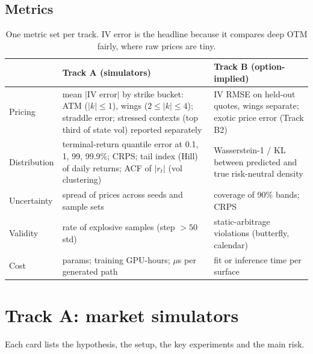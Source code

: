 \documentclass[10pt]{article}
\begin{document}
\subsection{Metrics}
\begin{table}[h]
\centering\small
\begin{tabularx}{\linewidth}{@{}l L L@{}}
\toprule
& \textbf{Track A (simulators)} & \textbf{Track B (option-implied)} \\
\midrule
Pricing & mean $|$IV error$|$ by strike bucket: ATM ($|k|\le1$), wings ($2\le|k|\le4$); straddle error; stressed contexts (top third of state vol) reported separately
& IV RMSE on held-out quotes, wings separate; exotic price error (Track B2)\\
Distribution & terminal-return quantile error at 0.1, 1, 99, 99.9\%; CRPS; tail index (Hill) of daily returns; ACF of $|r_t|$ (vol clustering)
& Wasserstein-1 / KL between predicted and true risk-neutral density \\
Uncertainty & spread of prices across seeds and sample sets
& coverage of 90\% bands; CRPS \\
Validity & rate of explosive samples (step $>50$ std)
& static-arbitrage violations (butterfly, calendar)\\
Cost & params; training GPU-hours; $\mu$s per generated path
& fit or inference time per surface\\
\bottomrule
\end{tabularx}
\caption{One metric set per track. IV error is the headline because it compares deep OTM fairly, where raw prices are tiny.}
\end{table}

\section{Track A: market simulators}

Each card lists the hypothesis, the setup, the key experiments and the main risk.
\end{document}
